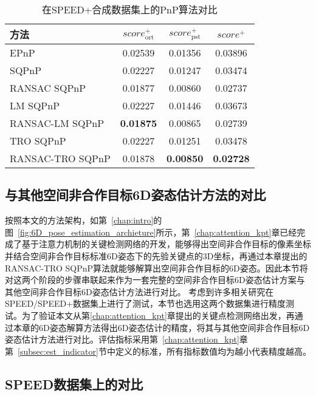 \begin{table}[!htbp]
	\centering
	\caption{在SPEED+合成数据集上的PnP算法对比}
	\setlength{\tabcolsep}{4.7mm}
	{
		\begin{tabular}{lccc}
			\toprule
			方法 & $score_{\text{ort}}^+$ & $score_{\text{pst}}^+$ & $score^+$  \\ \midrule
			EPnP \citep{EPnP} & 0.02539 & 0.01356 & 0.03896 \\
			SQPnP \citep{terzakis2020consistently} & 0.02227 & 0.01247  & 0.03474 \\
			RANSAC SQPnP & 0.01877 & 0.00860  & 0.02737 \\
			LM \citep{lm} SQPnP & 0.02227 & 0.01446 & 0.03673 \\
			RANSAC-LM SQPnP & \textbf{0.01875} & 0.00865 & 0.02739 \\
			TRO \citep{trf} SQPnP & 0.02227 & 0.01251 & 0.03478 \\
			RANSAC-TRO SQPnP & 0.01878 & \textbf{0.00850} & \textbf{0.02728} \\ 
			\bottomrule
	\end{tabular}}
	\label{tab:PnPCmp}
\end{table}



\subsection{与其他空间非合作目标6D姿态估计方法的对比}
\label{sec:RANSAC-TRO-SQPnP:OthersCompare}
按照本文的方法架构，如第~\ref{chap:intro}的图~\ref{fig:6D_pose_estimation_archieture}所示，第~\ref{chap:attention_kpt}章已经完成了基于注意力机制的关键检测网络的开发，能够得出空间非合作目标的像素坐标并结合空间非合作目标标准6D姿态下的先验关键点的3D坐标，再通过本章提出的RANSAC-TRO SQPnP算法就能够解算出空间非合作目标的6D姿态。因此本节将对这两个阶段的步骤串联起来作为一套完整的空间非合作目标6D姿态估计方案与其他空间非合作目标6D姿态估计方法进行对比。
考虑到许多相关研究在SPEED/SPEED+数据集上进行了测试，本节也选用这两个数据集进行精度测试。为了验证本文从第\ref{chap:attention_kpt}章提出的关键点检测网络出发，再通过本章的6D姿态解算方法得出6D姿态估计的精度，将其与其他空间非合作目标6D姿态估计方法进行对比。评估指标采用第~\ref{chap:attention_kpt}章第~\ref{subsec:est_indicator}节中定义的标准，所有指标数值均为越小代表精度越高。

\subsection{SPEED数据集上的对比}

